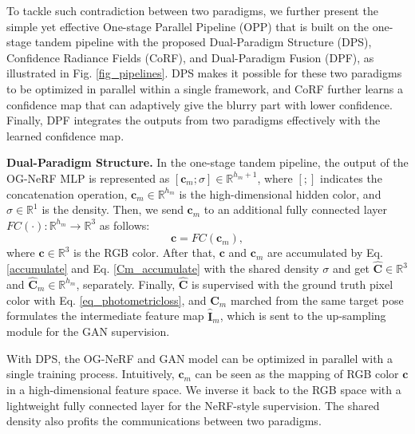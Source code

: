To tackle such contradiction between two paradigms, we further present the simple yet effective One-stage Parallel Pipeline (OPP) that is built on the one-stage tandem pipeline with the proposed Dual-Paradigm Structure (DPS), Confidence Radiance Fields (CoRF), and Dual-Paradigm Fusion (DPF), as illustrated in Fig. \ref{fig_pipelines}. 
DPS makes it possible for these two paradigms to be optimized in parallel within a single framework, and CoRF further learns a confidence map that can adaptively give the blurry part with lower confidence. Finally, DPF integrates the outputs from two paradigms effectively with the learned confidence map. 

\vspace{0.1cm}
\noindent\textbf{Dual-Paradigm Structure.}
 In the one-stage tandem pipeline,  the output of the OG-NeRF MLP is represented as $[\textbf{c}_m;\sigma] \in \mathbb{R}^{h_m + 1}$, where $[;]$ indicates the concatenation operation, $\textbf{c}_m \in \mathbb{R}^{h_m} $ is the high-dimensional hidden color, and $\sigma \in \mathbb{R}^{1}$ is the density. Then, we send $\textbf{c}_m$ to an additional fully connected layer $FC(\cdot): \mathbb{R}^{h_m} \rightarrow \mathbb{R}^{3} $ as follows:
\begin{equation}
    \textbf{c} = FC(\textbf{c}_m),
\end{equation}
where $\textbf{c} \in \mathbb{R}^{3}$ is the RGB color. After that, $\textbf{c}$ and $\textbf{c}_m$ are accumulated by Eq. \ref{accumulate} and Eq. \ref{Cm_accumulate} with the shared density $\sigma$ and get $\hat{\textbf{C}} \in \mathbb{R}^{3}$ and $\hat{\textbf{C}}_m \in \mathbb{R}^{h_m}$, separately. Finally, $\hat{\textbf{C}}$ is supervised with the ground truth pixel color with Eq. \ref{eq_photometricloss}, and $\hat{\textbf{C}}_m$ marched from the same target pose formulates the intermediate feature map $\hat{\textbf{I}}_m$, which is sent to the up-sampling module for the GAN supervision.


With DPS, the OG-NeRF and GAN model can be optimized in parallel with a single training process. Intuitively, $\textbf{c}_m$ can be seen as the mapping of RGB color $\textbf{c}$ in a high-dimensional feature space. We inverse it back to the RGB space with a lightweight fully connected layer for the NeRF-style supervision.
The shared density also profits the communications between two paradigms.

